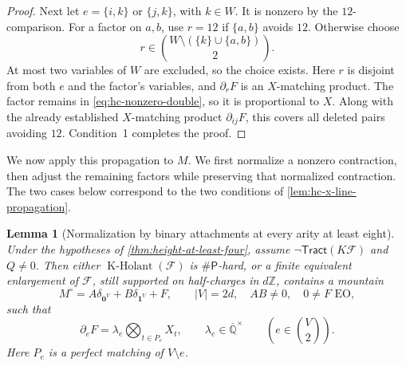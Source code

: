 \documentclass[11pt,letterpaper,onecolumn]{article}
\theoremstyle{plain}
\newtheorem{lemma}[lemma]{Lemma}
\theoremstyle{definition}
\theoremstyle{remark}
\newcommand{\AlgNums}{\overline{\mathbb Q}}
\newcommand{\cF}{\mathcal F}
\newcommand{\KHolant}{\operatorname{K\text{-}Holant}}
\newcommand{\Tract}{\mathsf{Tract}}
\newcommand{\SharpP}{\#\mathsf P}
\newcommand{\one}{\mathbf 1}
\newcommand{\zero}{\mathbf 0}
\begin{document}
\begin{proof}
		Next let \(e=\{i,k\}\) or \(\{j,k\}\), with \(k\in W\).
		It is nonzero by the \(12\)-comparison.  For a factor on \(a,b\), use
		\(r=12\) if \(\{a,b\}\) avoids \(12\). Otherwise choose
		\[
		r\in\binom{W\setminus(\{k\}\cup\{a,b\})}{2}.
		\]
		At most two variables of \(W\) are excluded, so the choice exists.
		Here \(r\) is disjoint from both \(e\) and the factor's variables, and
		\(\partial_rF\) is an \(X\)-matching product.  The factor remains in
		\eqref{eq:hc-nonzero-double}, so it is proportional to \(X\).
		Along with the already established \(X\)-matching product
		\(\partial_{ij}F\), this covers all deleted pairs avoiding
		\(12\).  Condition~1 completes the proof.
	\end{proof}
	
	We now apply this propagation to \(M\). We first
	normalize a nonzero contraction, then adjust the remaining factors while
	preserving that normalized contraction. The two cases below correspond
	to the two conditions of \cref{lem:hc-x-line-propagation}.
	\begin{lemma}[Normalization by binary attachments at every arity at least eight]
		\label{lem:hc-port-normalization}
		Under the hypotheses of \cref{thm:height-at-least-four}, assume
		\(\neg\Tract(K\cF)\) and \(Q\ne0\).
		Then either \(\KHolant(\cF)\) is \(\SharpP\)-hard, or a finite equivalent
		enlargement of \(\cF\), still supported on half-charges in
		\(d\mathbb Z\), contains a mountain
		\[
		M^\circ=A\delta_{\zero^V}+B\delta_{\one^V}+F,
		\qquad |V|=2d,\quad AB\ne0,\quad 0\ne F\text{ EO},
		\]
		such that
		\begin{equation}
		\partial_eF=\lambda_e\bigotimes_{t\in P_e}X_t,
		\qquad \lambda_e\in\AlgNums^\times
		\qquad\left(e\in\binom V2\right).
		\label{eq:hc-normalized-deck}
		\end{equation}
		Here \(P_e\) is a perfect matching of \(V\setminus e\).
		
	\end{lemma}
	
\end{document}
